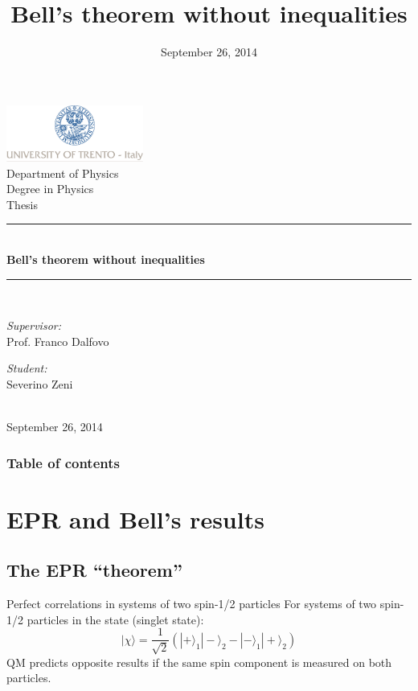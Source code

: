 \documentclass[10pt]{beamer}
\title{Bell's theorem without inequalities}
\institute{Severino Zeni}%
\date{September 26, 2014}
\begin{document}

\begin{frame}
  \thispagestyle{empty}
  \begin{center}
    \includegraphics[width=4.5cm]{Images/logo-unitn.jpg}\\[-0.1cm]
    {\small Department of Physics}\\[0.6cm]
    {\small Degree in Physics}\\[0cm]
    {\small Thesis}\\[-0.1cm]
    \rule{\linewidth}{0.2mm}\\[0.3cm]
    { \Large \bfseries Bell's theorem without inequalities}\\[0cm]
    \rule{\linewidth}{0.2mm}\\[0.5cm]
    \begin{minipage}{0.4\textwidth}
      \begin{flushleft} \small
        \emph{Supervisor:} \\[0cm]
        Prof. Franco Dalfovo
      \end{flushleft}
    \end{minipage}
    \begin{minipage}{0.4\textwidth}
      \begin{flushright} \small
        \emph{Student:}\\[0cm]
        Severino Zeni
      \end{flushright}
    \end{minipage}\\[0.6cm]
    \vfill
    {\small September 26, 2014}
  \end{center}
\end{frame}




\begin{frame}
  \frametitle{Table of contents}
  \tableofcontents
\end{frame}

\section{EPR and Bell's results}
\subsection{The EPR ``theorem''}
\begin{frame}{Perfect correlations in systems of two spin-1/2 particles}
  For systems of two spin-1/2 particles in the state (singlet state):
  \begin{equation*}
    |\chi\rangle = \frac{1}{\sqrt{2}} \left( |+\rangle_1 |-\rangle_2 - |-\rangle_1 |+\rangle_2 \right)
    \label{eq:singlet-state}
  \end{equation*}
  QM predicts opposite results if the same spin component is measured on both particles.
\end{frame}
\end{document}
